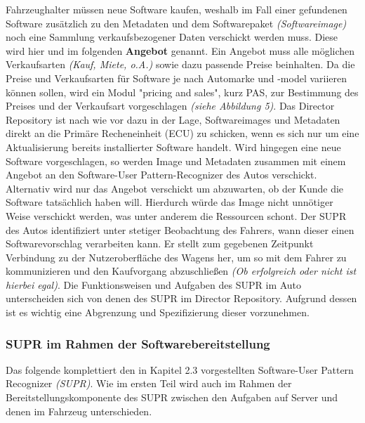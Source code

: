 Fahrzeughalter müssen neue Software kaufen, weshalb im Fall einer gefundenen Software zusätzlich zu den Metadaten und dem Softwarepaket \textit{(Softwareimage)} noch eine Sammlung verkaufsbezogener Daten verschickt werden muss. Diese wird hier und im folgenden \textbf{Angebot} genannt. Ein Angebot muss alle möglichen Verkaufsarten \textit{(Kauf, Miete, o.A.)} sowie dazu passende Preise beinhalten. Da die Preise und Verkaufsarten für Software je nach Automarke und -model variieren können sollen, wird ein Modul "pricing and sales", kurz PAS, zur Bestimmung des Preises und der Verkaufsart vorgeschlagen \textit{(siehe Abbildung 5)}. Das Director Repository ist nach wie vor dazu in der Lage, Softwareimages und Metadaten direkt an die Primäre Recheneinheit (ECU) zu schicken, wenn es sich nur um eine Aktualisierung bereits installierter Software handelt. Wird hingegen eine neue Software vorgeschlagen, so werden Image und Metadaten zusammen mit einem Angebot an den Software-User Pattern-Recognizer des Autos verschickt. Alternativ wird nur das Angebot verschickt um abzuwarten, ob der Kunde die Software tatsächlich haben will. Hierdurch würde das Image nicht unnötiger Weise verschickt werden, was unter anderem die Ressourcen schont. Der SUPR des Autos identifiziert unter stetiger Beobachtung des Fahrers, wann dieser einen Softwarevorschlag verarbeiten kann. Er stellt zum gegebenen Zeitpunkt Verbindung zu der Nutzeroberfläche des Wagens her, um so mit dem Fahrer zu kommunizieren und den Kaufvorgang abzuschließen \textit{(Ob erfolgreich oder nicht ist hierbei egal)}. Die Funktionsweisen und Aufgaben des SUPR im Auto unterscheiden sich von denen des SUPR im Director Repository. Aufgrund dessen ist es wichtig eine Abgrenzung und Spezifizierung dieser vorzunehmen.\\

\subsubsection{SUPR im Rahmen der Softwarebereitstellung}\label{3.3}
Das folgende komplettiert den in Kapitel 2.3 vorgestellten Software-User Pattern Recognizer \textit{(SUPR)}. Wie im ersten Teil wird auch im Rahmen der Bereitstellungskomponente des SUPR zwischen den Aufgaben auf Server und denen im Fahrzeug unterschieden.\\

